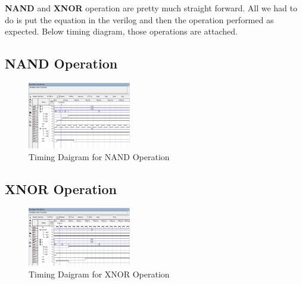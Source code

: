 \textbf{NAND} and \textbf{XNOR} operation are pretty much straight forward.
All we had to do is put the equation in the verilog and then the
operation performed as expected.
Below timing diagram, those operations are attached.

\subsection{NAND Operation}\label{subsec:nand-operation}

\begin{figure}[H]
    \begin{center}
        \includegraphics[width = 0.4\textwidth]{figures/nand}
    \end{center}
    \caption{Timing Daigram for NAND Operation}
    \label{fig:timing nand}
\end{figure}

\subsection{XNOR Operation}\label{subsec:xnor-operation}
\begin{figure}[H]
    \begin{center}
        \includegraphics[width = 0.4\textwidth]{figures/xnor}
    \end{center}
    \caption{Timing Daigram for XNOR Operation}
    \label{fig:timing xnor}
\end{figure}

